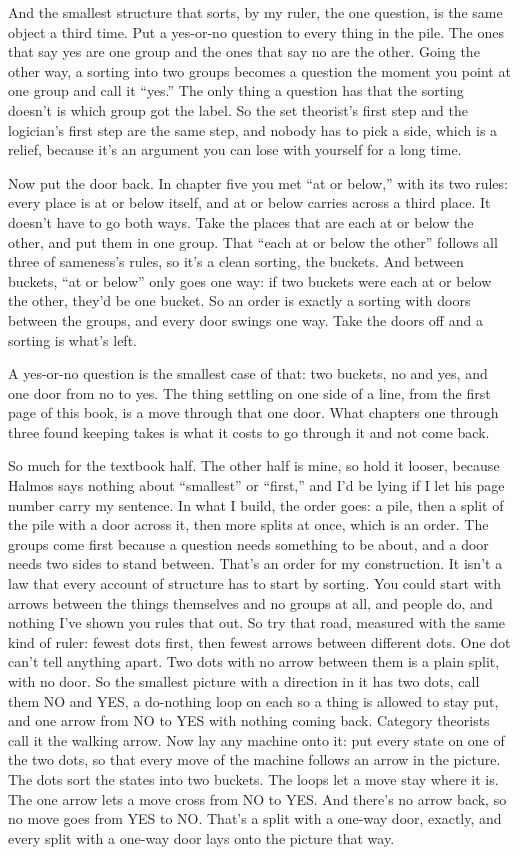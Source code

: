 \documentclass[11pt,twoside]{article}
\theoremstyle{thielethm}
\theoremstyle{thieledef}
\theoremstyle{thieledef}
\theoremstyle{thieledef}
\theoremstyle{thielethm}
\theoremstyle{thieleobs}
\theoremstyle{thielethm}
\begin{document}
And the smallest structure that sorts, by my ruler, the one question, is the same object a third time. Put a yes-or-no question to every thing in the pile. The ones that say yes are one group and the ones that say no are the other. Going the other way, a sorting into two groups becomes a question the moment you point at one group and call it ``yes.'' The only thing a question has that the sorting doesn't is which group got the label. So the set theorist's first step and the logician's first step are the same step, and nobody has to pick a side, which is a relief, because it's an argument you can lose with yourself for a long time.

Now put the door back. In chapter five you met ``at or below,'' with its two rules: every place is at or below itself, and at or below carries across a third place. It doesn't have to go both ways. Take the places that are each at or below the other, and put them in one group. That ``each at or below the other'' follows all three of sameness's rules, so it's a clean sorting, the buckets. And between buckets, ``at or below'' only goes one way: if two buckets were each at or below the other, they'd be one bucket. So an order is exactly a sorting with doors between the groups, and every door swings one way. Take the doors off and a sorting is what's left.

A yes-or-no question is the smallest case of that: two buckets, no and yes, and one door from no to yes. The thing settling on one side of a line, from the first page of this book, is a move through that one door. What chapters one through three found keeping takes is what it costs to go through it and not come back.

So much for the textbook half. The other half is mine, so hold it looser, because Halmos says nothing about ``smallest'' or ``first,'' and I'd be lying if I let his page number carry my sentence. In what I build, the order goes: a pile, then a split of the pile with a door across it, then more splits at once, which is an order. The groups come first because a question needs something to be about, and a door needs two sides to stand between. That's an order for my construction. It isn't a law that every account of structure has to start by sorting. You could start with arrows between the things themselves and no groups at all, and people do, and nothing I've shown you rules that out. So try that road, measured with the same kind of ruler: fewest dots first, then fewest arrows between different dots. One dot can't tell anything apart. Two dots with no arrow between them is a plain split, with no door. So the smallest picture with a direction in it has two dots, call them NO and YES, a do-nothing loop on each so a thing is allowed to stay put, and one arrow from NO to YES with nothing coming back. Category theorists call it the walking arrow. Now lay any machine onto it: put every state on one of the two dots, so that every move of the machine follows an arrow in the picture. The dots sort the states into two buckets. The loops let a move stay where it is. The one arrow lets a move cross from NO to YES. And there's no arrow back, so no move goes from YES to NO. That's a split with a one-way door, exactly, and every split with a one-way door lays onto the picture that way.
\end{document}
